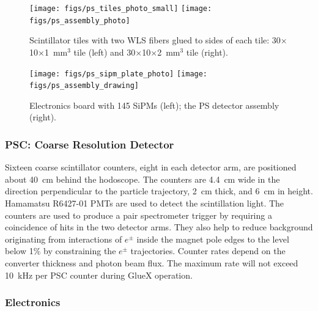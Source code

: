 \begin{figure}[h]
\begin{center}
   \texttt{[image: figs/ps\_tiles\_photo\_small]}\hspace{0.05\linewidth}%
   \texttt{[image: figs/ps\_assembly\_photo]}
\end{center}
\caption{Scintillator tiles with two WLS fibers glued to sides of each tile: 30$\times$10$\times$1~mm$^3$ tile (left) 
         and 30$\times$10$\times$2~mm$^3$  tile (right).
        }
\label{fig:beam:ps-tiles} 
\end{figure}

\begin{figure}[h]
\begin{center}
   \texttt{[image: figs/ps\_sipm\_plate\_photo]}\hspace{0.05\linewidth}%
   \texttt{[image: figs/ps\_assembly\_drawing]}
\end{center}
\caption{Electronics board with 145 SiPMs (left); 
         the PS detector assembly (right).
        }
\label{fig:beam:ps-electr-assemb} 
\end{figure}

\subsubsection[PSC: Coarse Resolution Detector]{PSC: Coarse Resolution Detector
  \label{sec:beamline:ps-coarse} }


Sixteen coarse scintillator counters, eight in each detector arm, are
positioned about 40~cm behind the hodoscope.  The counters are 4.4~cm
wide in the direction perpendicular to the particle trajectory, 2~cm
thick, and 6~cm in height.  Hamamatsu R6427-01 PMTs are used to detect
the scintillation light. The counters are used to produce a pair
spectrometer trigger by requiring a coincidence of hits in the two
detector arms. They also help to reduce background originating from
interactions of $e^\pm$ inside the magnet pole edges to the level
below 1\% by constraining the $e^\pm$ trajectories.  Counter rates
depend on the converter thickness and photon beam flux. The maximum
rate will not exceed 10~kHz per PSC counter during GlueX operation.


\subsubsection[Electronics]{Electronics
  \label{sec:beamline:ps-electronics}
}

